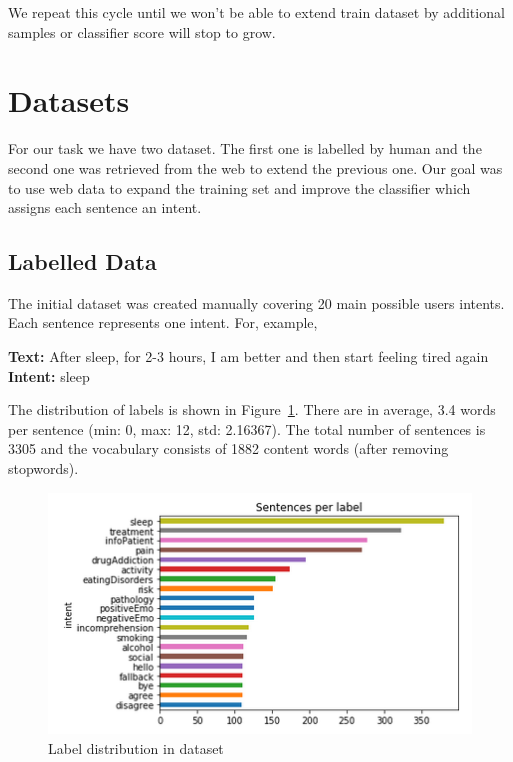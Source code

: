 \documentclass[11pt]{article}
\begin{document}
We repeat this cycle until we won't be able to extend train dataset by additional samples or classifier score will stop to grow.

\section{Datasets}

For our task we have two dataset. The first one is labelled by human and the second one was retrieved from the web to extend the previous one. Our goal was to use web data to expand the training set and improve the classifier which assigns each sentence an intent. 

\subsection{Labelled Data}
\label{subsec:labelleddata}
The initial dataset was created manually  covering 20 main possible users intents. Each sentence represents one intent. For, example,

\textbf{Text:} After sleep, for 2-3 hours, I am better and then start feeling tired again\\
\textbf{Intent:} sleep

The distribution of labels is shown in Figure~\ref{figure:name}. There
are in average, 3.4 words per sentence (min: 0, max: 12, std:
2.16367).  The total number of sentences is 3305 and the vocabulary
consists of 1882 content words (after removing stopwords).

 \begin{figure}[h]
 	\centering
 	\includegraphics[scale=0.5]{report1.png}
	\caption{Label distribution in dataset}
 \label{figure:name}
 \end{figure}
\FloatBarrier
\end{document}
